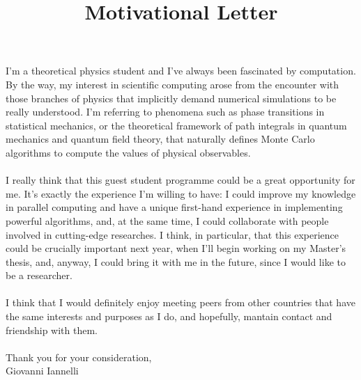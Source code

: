 \documentclass{article}
\title{Motivational Letter}
\date{}
\begin{document}
\maketitle

I'm a theoretical physics student and I've always been fascinated by computation. By the way, my interest in scientific computing arose from the encounter with those branches of physics that implicitly demand numerical simulations to be really understood. I'm referring to phenomena such as phase transitions in statistical mechanics, or the theoretical framework of path integrals in quantum mechanics and quantum field theory, that naturally defines Monte Carlo algorithms to compute the values of physical observables.\\ \\
I really think that this guest student programme could be a great opportunity for me. It's exactly the experience I'm willing to have: I could improve my knowledge in parallel computing and have a unique first-hand experience in implementing powerful algorithms, and, at the same time, I could collaborate with people involved in cutting-edge researches. I think, in particular, that this experience could be crucially important next year, when I'll begin working on my Master's thesis, and, anyway, I could bring it with me in the future, since I would like to be a researcher.\\ \\
I think that I would definitely enjoy meeting peers from other countries that have the same interests and purposes as I do, and hopefully, mantain contact and friendship with them.\\ \\
Thank you for your consideration,\\
Giovanni Iannelli
\end{document}
